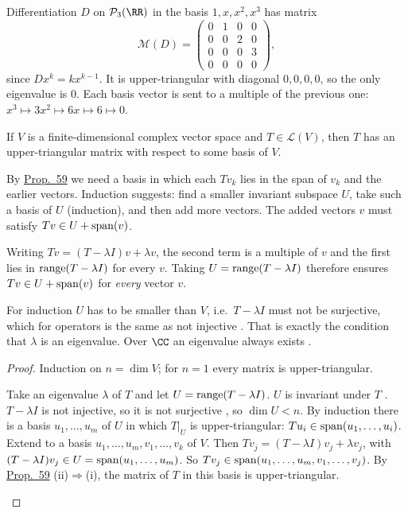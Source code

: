 \documentclass[10pt]{scrartcl}
\newcommand{\LL}{\mathcal L}\newcommand{\PP}{\mathcal P}\newcommand{\MM}{\mathcal M}
\begin{document}
\begin{example*}[Ex.~54]\hypertarget{ex-54}{}\label{ex-54}
  Differentiation $D$ on $\PP_3(\RR)$ in the basis $1,x,x^2,x^3$ has matrix
  \[
    \MM(D) = \begin{pmatrix}0&1&0&0\\0&0&2&0\\0&0&0&3\\0&0&0&0\end{pmatrix},
  \]
  since $Dx^k=kx^{k-1}$. It is upper-triangular with diagonal $0,0,0,0$, so the only eigenvalue is $0$. Each basis vector is sent to a multiple of the previous one: $x^3\mapsto3x^2\mapsto6x\mapsto6\mapsto0$.
\end{example*}

\begin{theorem*}\hypertarget{prop-61}{}\label{prop-61}
  If $V$ is a finite-dimensional complex vector space and $T\in\LL(V)$, then $T$ has an upper-triangular matrix with respect to some basis of $V$.
\end{theorem*}
\begin{ideabox}
By \hyperref[prop-59]{Prop.~59} we need a basis in which each $Tv_k$ lies in the span of $v_k$ and the earlier vectors. Induction suggests: find a smaller invariant subspace $U$, take such a basis of $U$ (induction), and then add more vectors. The added vectors $v$ must satisfy $Tv\in U+\operatorname{span}(v)$.

Writing $Tv=(T-\lambda I)v+\lambda v$, the second term is a multiple of $v$ and the first lies in $\operatorname{range}(T-\lambda I)$ for every $v$. Taking $U=\operatorname{range}(T-\lambda I)$ therefore ensures $Tv\in U+\operatorname{span}(v)$ for \emph{every} vector $v$.

For induction $U$ has to be smaller than $V$, i.e.\ $T-\lambda I$ must not be surjective, which for operators is the same as not injective . That is exactly the condition that $\lambda$ is an eigenvalue. Over $\CC$ an eigenvalue always exists .
\end{ideabox}
\begin{proof}
  Induction on $n=\dim V$; for $n=1$ every matrix is upper-triangular.
  \begin{steps}
    \ii Take an eigenvalue $\lambda$ of $T$  and let $U=\operatorname{range}(T-\lambda I)$. $U$ is invariant under $T$ . $T-\lambda I$ is not injective, so it is not surjective , so $\dim U<n$.
    \ii By induction there is a basis $u_1,\dots,u_m$ of $U$ in which $T|_U$ is upper-triangular: $Tu_i\in\operatorname{span}(u_1,\dots,u_i)$.
    \ii Extend to a basis $u_1,\dots,u_m,v_1,\dots,v_k$ of $V$. Then $Tv_j=(T-\lambda I)v_j+\lambda v_j$, with $(T-\lambda I)v_j\in U=\operatorname{span}(u_1,\dots,u_m)$. So $Tv_j\in\operatorname{span}(u_1,\dots,u_m,v_1,\dots,v_j)$.
    \ii By \hyperref[prop-59]{Prop.~59} (ii)$\Rightarrow$(i), the matrix of $T$ in this basis is upper-triangular.
  \end{steps}
\end{proof}
\end{document}
